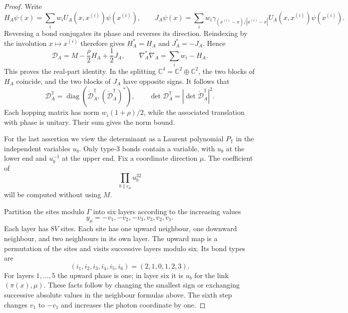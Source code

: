 \documentclass[11pt,letterpaper,reqno]{amsart}
\newcommand{\C}{\mathbb C}
\DeclareMathOperator{\diag}{diag}
\begin{document}
\begin{proof}
Write
\[
 H_A\psi(x)=\sum_iw_iU_A(x,x^{(i)})\psi(x^{(i)}),\qquad
 J_A\psi(x)=\sum_iw_i\gamma_{(x^{(i)}-x)/|x^{(i)}-x|}
                         U_A(x,x^{(i)})\psi(x^{(i)}).
\]
Reversing a bond conjugates its phase and reverses its direction.
Reindexing by the involution $x\mapsto x^{(i)}$ therefore gives
$H_A^*=H_A$ and $J_A^*=-J_A$. Hence
\[
 \mathcal D_A=M-\frac\rho2H_A+\frac12J_A,\qquad
 \nabla_A^*\nabla_A=\sum_iw_i-H_A.
\]
This proves the real-part identity. In the splitting
$\C^4=\C^2\oplus\C^2$, the two blocks of $H_A$ coincide, and the two
blocks of $J_A$ have opposite signs. It follows that
\begin{equation}\label{eq:reg-two-blocks}
 \mathcal D_A^{\mathbb T}=\diag(\check{\mathcal D}_A^{\mathbb T},
                                      (\check{\mathcal D}_A^{\mathbb T})^*),
 \qquad \det \mathcal D_A^{\mathbb T}=|\det\check{\mathcal D}_A^{\mathbb T}|^2.
\end{equation}
Each hopping matrix has norm $w_i(1+\rho)/2$, while the associated
translation with phase is unitary. Their sum gives the norm bound.

For the last assertion we view the determinant as a Laurent
polynomial $P_{\mathbb T}$ in the independent variables $u_b$.
Only type-$3$ bonds contain a variable, with $u_b$ at the lower end
and $u_b^{-1}$ at the upper end. Fix a coordinate direction $\mu$.
The coefficient of
\begin{equation}\label{eq:reg-extreme-monomial}
 \prod_{b\parallel e_\mu}u_b^{32}
\end{equation}
will be computed without using $M$.

Partition the sites modulo $\Gamma$ into six layers according to
the increasing values
\[
 y_\mu=-v_1,-v_2,-v_3,v_3,v_2,v_1.
\]
Each layer has $8V$ sites. Each site has one upward neighbour,
one downward neighbour, and two neighbours in its own layer. The
upward map is a permutation of the sites and visits successive layers
modulo six. Its bond types are
\begin{equation}\label{eq:reg-upward-types}
 (i_1,i_2,i_3,i_4,i_5,i_6)=(2,1,0,1,2,3).
\end{equation}
For layers $1,\ldots,5$ the upward phase is one; in layer six it is
$u_b$ for the link $(\pi(x),\mu)$. These facts follow by changing the
smallest sign or exchanging successive absolute values in the
neighbour formulas above. The sixth step changes $v_1$ to $-v_1$
and increases the photon coordinate by one.


\end{proof}
\end{document}
